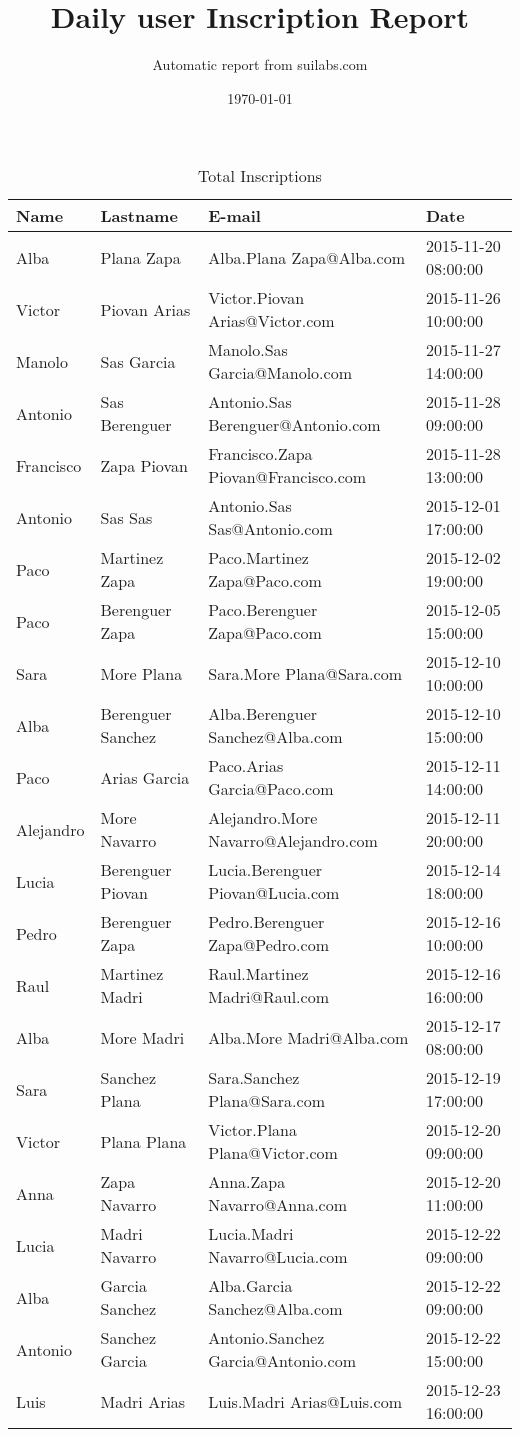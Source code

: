 \documentclass{article}
\title{Daily user Inscription Report}
\author{Automatic report from suilabs.com}
\date{\today}
\begin{document}
\maketitle
    \begin{table}[]
\centering
\caption{Total Inscriptions}
\label{lblTotal Inscriptions}
\begin{tabular}{|llll|}
\textbf{Name} &\textbf{Lastname} &\textbf{E-mail} &\textbf{Date} \\
\hline 
Alba & Plana Zapa & Alba.Plana Zapa@Alba.com & 2015-11-20 08:00:00 \\
Victor & Piovan Arias & Victor.Piovan Arias@Victor.com & 2015-11-26 10:00:00 \\
Manolo & Sas Garcia & Manolo.Sas Garcia@Manolo.com & 2015-11-27 14:00:00 \\
Antonio & Sas Berenguer & Antonio.Sas Berenguer@Antonio.com & 2015-11-28 09:00:00 \\
Francisco & Zapa Piovan & Francisco.Zapa Piovan@Francisco.com & 2015-11-28 13:00:00 \\
Antonio & Sas Sas & Antonio.Sas Sas@Antonio.com & 2015-12-01 17:00:00 \\
Paco & Martinez Zapa & Paco.Martinez Zapa@Paco.com & 2015-12-02 19:00:00 \\
Paco & Berenguer Zapa & Paco.Berenguer Zapa@Paco.com & 2015-12-05 15:00:00 \\
Sara & More Plana & Sara.More Plana@Sara.com & 2015-12-10 10:00:00 \\
Alba & Berenguer Sanchez & Alba.Berenguer Sanchez@Alba.com & 2015-12-10 15:00:00 \\
Paco & Arias Garcia & Paco.Arias Garcia@Paco.com & 2015-12-11 14:00:00 \\
Alejandro & More Navarro & Alejandro.More Navarro@Alejandro.com & 2015-12-11 20:00:00 \\
Lucia & Berenguer Piovan & Lucia.Berenguer Piovan@Lucia.com & 2015-12-14 18:00:00 \\
Pedro & Berenguer Zapa & Pedro.Berenguer Zapa@Pedro.com & 2015-12-16 10:00:00 \\
Raul & Martinez Madri & Raul.Martinez Madri@Raul.com & 2015-12-16 16:00:00 \\
Alba & More Madri & Alba.More Madri@Alba.com & 2015-12-17 08:00:00 \\
Sara & Sanchez Plana & Sara.Sanchez Plana@Sara.com & 2015-12-19 17:00:00 \\
Victor & Plana Plana & Victor.Plana Plana@Victor.com & 2015-12-20 09:00:00 \\
Anna & Zapa Navarro & Anna.Zapa Navarro@Anna.com & 2015-12-20 11:00:00 \\
Lucia & Madri Navarro & Lucia.Madri Navarro@Lucia.com & 2015-12-22 09:00:00 \\
Alba & Garcia Sanchez & Alba.Garcia Sanchez@Alba.com & 2015-12-22 09:00:00 \\
Antonio & Sanchez Garcia & Antonio.Sanchez Garcia@Antonio.com & 2015-12-22 15:00:00 \\
Luis & Madri Arias & Luis.Madri Arias@Luis.com & 2015-12-23 16:00:00 \\
\end{tabular}
\end{table}
\end{document}
